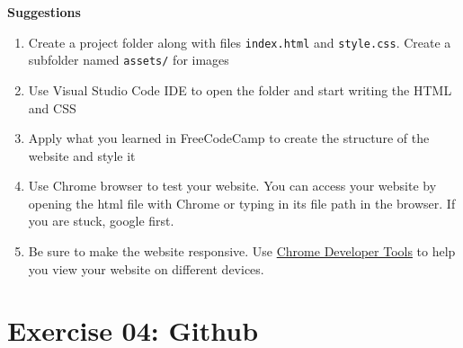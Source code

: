 \documentclass{42-en}
\begin{document}
\textbf{Suggestions}
\begin{enumerate}
    \item Create a project folder along with files \texttt{index.html} and \texttt{style.css}. Create a subfolder named \texttt{assets/} for images
    \item Use Visual Studio Code IDE to open the folder and start writing the HTML and CSS
    \item Apply what you learned in FreeCodeCamp to create the structure of the website and style it
    \item Use Chrome browser to test your website. You can access your website by opening the html file with Chrome or typing in its file path in the browser. If you are stuck, google first.
    \item Be sure to make the website responsive. Use \href{https://developers.google.com/web/tools/chrome-devtools/device-mode}{Chrome Developer Tools} to help you view your website on different devices.
\end{enumerate}


\chapter{Exercise 04: Github}

\exnumber{\exercicenumber}

\makeheaderfiles
\end{document}

